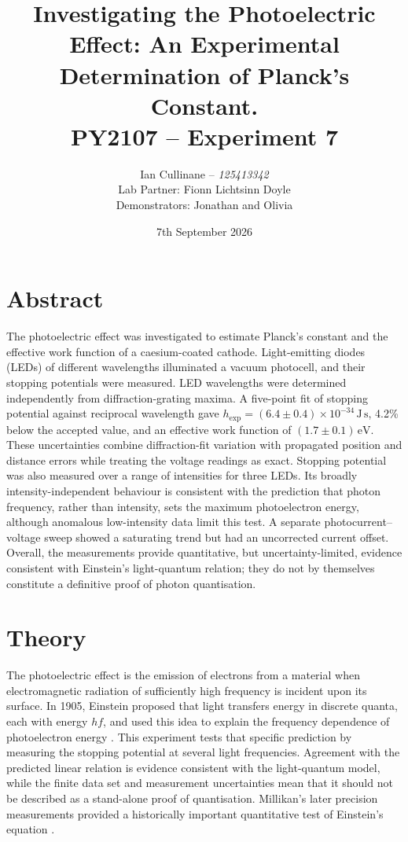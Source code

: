 \documentclass[12pt,a4paper]{article}
\title{
    \Large\textbf{Investigating the Photoelectric Effect: An Experimental Determination of Planck’s Constant.}\\[0.5em]
    \large PY2107 -- Experiment 7
}
\author{
    Ian Cullinane -- \textit{125413342}\\[0.5em]
    Lab Partner: Fionn Lichtsinn Doyle\\[0.5em]
    Demonstrators: Jonathan and Olivia
}
\date{7th September 2026}
\begin{document}
\maketitle
\thispagestyle{empty}

\newpage
\tableofcontents
\newpage

\section{Abstract}

The photoelectric effect was investigated to estimate Planck's constant and the effective work function of a caesium-coated cathode. Light-emitting diodes (LEDs) of different wavelengths illuminated a vacuum photocell, and their stopping potentials were measured. LED wavelengths were determined independently from diffraction-grating maxima. A five-point fit of stopping potential against reciprocal wavelength gave \(h_{\mathrm{exp}}=(6.4\pm0.4)\times10^{-34}\,\mathrm{J\,s}\), 4.2\% below the accepted value, and an effective work function of \((1.7\pm0.1)\,\mathrm{eV}\). These uncertainties combine diffraction-fit variation with propagated position and distance errors while treating the voltage readings as exact. Stopping potential was also measured over a range of intensities for three LEDs. Its broadly intensity-independent behaviour is consistent with the prediction that photon frequency, rather than intensity, sets the maximum photoelectron energy, although anomalous low-intensity data limit this test. A separate photocurrent--voltage sweep showed a saturating trend but had an uncorrected current offset. Overall, the measurements provide quantitative, but uncertainty-limited, evidence consistent with Einstein's light-quantum relation; they do not by themselves constitute a definitive proof of photon quantisation.

\newpage

\section{Theory}

The photoelectric effect is the emission of electrons from a material when electromagnetic radiation of sufficiently high frequency is incident upon its surface. In 1905, Einstein proposed that light transfers energy in discrete quanta, each with energy \(hf\), and used this idea to explain the frequency dependence of photoelectron energy \cite{einstein1905}. This experiment tests that specific prediction by measuring the stopping potential at several light frequencies. Agreement with the predicted linear relation is evidence consistent with the light-quantum model, while the finite data set and measurement uncertainties mean that it should not be described as a stand-alone proof of quantisation. Millikan's later precision measurements provided a historically important quantitative test of Einstein's equation \cite{millikan1916}.
\end{document}
